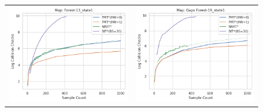\documentclass{article}
\begin{document}
\begin{figure}
{\begin{tabular}{cc}
			\includegraphics[scale=0.45]{scVcc_Forest-13_state1.png} & \includegraphics[scale=0.45]{scVcc_Gaps Forest-19_state1.png}    \\

\end{tabular}}
\end{figure}
\end{document}
